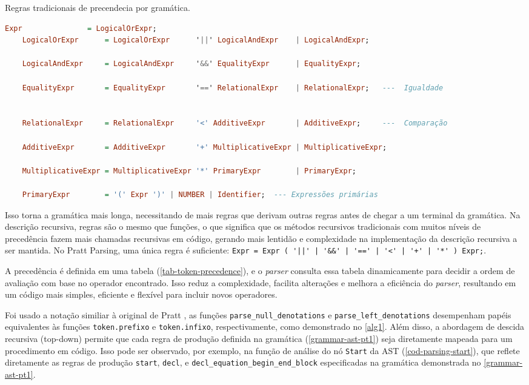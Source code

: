 \begin{codigo}[htb]
    \caption{\small Regras tradicionais de precendecia por gramática. }
    \label{cod-regras-tradicionais}
\begin{lstlisting}[language=haskell, numbers=none, inputencoding=utf8]
    Expr               = LogicalOrExpr;
    LogicalOrExpr      = LogicalOrExpr      '||' LogicalAndExpr    | LogicalAndExpr;

    LogicalAndExpr     = LogicalAndExpr     '&&' EqualityExpr      | EqualityExpr;

    EqualityExpr       = EqualityExpr       '==' RelationalExpr    | RelationalExpr;   ---  Igualdade


    RelationalExpr     = RelationalExpr     '<' AdditiveExpr       | AdditiveExpr;     ---  Comparação

    AdditiveExpr       = AdditiveExpr       '+' MultiplicativeExpr | MultiplicativeExpr;

    MultiplicativeExpr = MultiplicativeExpr '*' PrimaryExpr        | PrimaryExpr;

    PrimaryExpr        = '(' Expr ')' | NUMBER | Identifier;  --- Expressões primárias

\end{lstlisting}
\end{codigo}


Isso torna a gramática mais longa, necessitando de mais regras que derivam outras regras antes de chegar a um terminal da gramática. Na descrição recursiva, regras são o mesmo que funções, o que significa que os métodos recursivos tradicionais com muitos níveis de precedência fazem mais chamadas recursivas em código, gerando mais lentidão e complexidade na implementação da descrição recursiva a ser mantida. No Pratt Parsing, uma única regra é suficiente:
\verb`Expr = Expr ( '||' | '&&' | '==' | '<' | '+' | '*' ) Expr;`.

A precedência é definida em uma tabela (\autoref{tab-token-precedence}), e o \textit{parser} consulta essa tabela dinamicamente para decidir a ordem de avaliação com base no operador encontrado. Isso reduz a complexidade, facilita alterações e melhora a eficiência do \textit{parser}, resultando em um código mais simples, eficiente e flexível para incluir novos operadores.

Foi usado a notação similiar à original de Pratt \cite{pratt}, as funções \verb"parse_null_denotations" e \texttt{parse\_left\_denotations} desempenham papéis equivalentes às funções \texttt{token.prefixo} e \texttt{token.infixo}, respectivamente, como demonstrado no \autoref{alg1}. Além disso, a abordagem de descida recursiva (top-down) permite que cada regra de produção definida na gramática (\autoref{grammar-ast-pt1}) seja diretamente mapeada para um procedimento em código. Isso pode ser observado, por exemplo, na função de análise do nó \texttt{Start} da AST (\autoref{cod-parsing-start}), que reflete diretamente as regras de produção \texttt{start}, \texttt{decl}, e \texttt{decl\_equation\_begin\_end\_block} especificadas na gramática demonstrada no \autoref{grammar-ast-pt1}.

